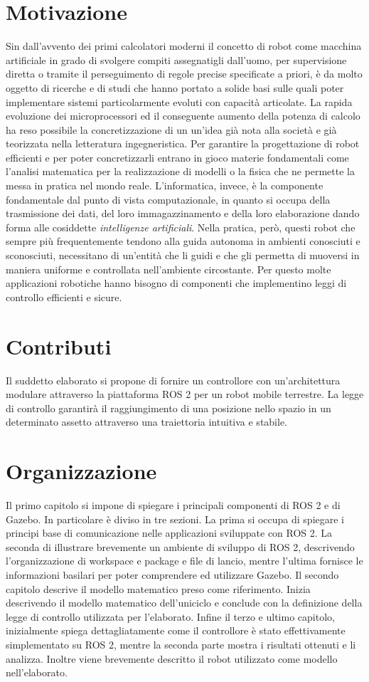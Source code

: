 \documentclass[a4paper,11 pt,oneside]{book}
\theoremstyle{definition}
\begin{document}
\section*{Motivazione}
Sin dall'avvento dei primi calcolatori moderni il concetto di robot come macchina artificiale in grado di svolgere compiti assegnatigli dall'uomo, per supervisione diretta o tramite il perseguimento di regole precise specificate a priori, è da molto oggetto di ricerche e di studi che hanno portato a solide basi sulle quali poter implementare sistemi particolarmente evoluti con capacità articolate.
La rapida evoluzione dei microprocessori ed il conseguente aumento della potenza di calcolo ha reso possibile la concretizzazione di un un'idea già nota alla società e già teorizzata nella letteratura ingegneristica.
Per garantire la progettazione di robot efficienti e per poter concretizzarli entrano in gioco materie fondamentali come l'analisi matematica per la realizzazione di modelli o la fisica che ne permette la messa in pratica nel mondo reale. L'informatica,  invece, è la componente fondamentale dal punto di vista computazionale, in quanto si occupa della trasmissione dei dati, del loro immagazzinamento e della loro elaborazione dando forma alle cosiddette \emph{intelligenze artificiali}.
Nella pratica, però, questi robot che sempre più frequentemente tendono alla guida autonoma in ambienti conosciuti e sconosciuti, necessitano di un'entità che li guidi e che gli permetta di muoversi in maniera uniforme e controllata nell'ambiente circostante.
Per questo molte applicazioni robotiche hanno bisogno di componenti che implementino leggi di controllo efficienti e sicure.

\section*{Contributi}
Il suddetto elaborato si propone di fornire un controllore con un'architettura modulare attraverso la piattaforma ROS 2 per un robot mobile terrestre.
La legge di controllo garantirà il raggiungimento di una posizione nello spazio in un determinato assetto attraverso una traiettoria intuitiva e stabile.

	
\section*{Organizzazione}
Il primo capitolo si impone di spiegare i principali componenti di ROS 2 e di Gazebo.
In particolare è diviso in tre sezioni. La prima si occupa di spiegare i principi base di comunicazione nelle applicazioni sviluppate con ROS 2. La seconda di illustrare brevemente un ambiente di sviluppo di ROS 2, descrivendo l'organizzazione di workspace e package e file di lancio, mentre l'ultima fornisce le informazioni basilari per poter comprendere ed utilizzare Gazebo.
Il secondo capitolo descrive il modello matematico preso come riferimento. Inizia descrivendo il modello matematico dell'uniciclo e conclude con la definizione della legge di controllo utilizzata per l'elaborato.
Infine il terzo e ultimo capitolo, inizialmente spiega dettagliatamente come il controllore è stato effettivamente simplementato su ROS 2, mentre la seconda parte mostra i risultati ottenuti e li analizza. Inoltre viene brevemente descritto il robot utilizzato come modello nell'elaborato.
\end{document}
